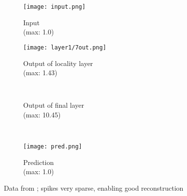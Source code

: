 \begin{figure}[h]
	\centering
	\graphicspath{{resources/models/3neurEx/fullRun/cycle_clean/}}
	\begin{subfigure}{.16\textwidth}
		\centering
		\texttt{[image: input.png]}
		\caption{Input\\(max: 1.0)}
	\end{subfigure}
	\begin{minipage}{.5\textwidth}
		\centering
		\begin{subfigure}{.8\textwidth}
			\centering
			\texttt{[image: layer1/7out.png]}
			\caption{Output of locality layer\\(max: 1.43)}
		\end{subfigure}\\
		\vfill
		\begin{subfigure}{.8\textwidth}
			\centering
			\caption{Output of final layer\\(max: 10.45)}
		\end{subfigure}
	\end{minipage}
	\begin{minipage}{.25\textwidth}
		\centering
		\vspace{-10pt}
		\hspace{-15pt}
		\\
		\vspace{2em}
		\begin{subfigure}{\textwidth}
			\centering
			\texttt{[image: pred.png]}
			\caption{Prediction\\(max: 1.0)}
		\end{subfigure}
	\end{minipage}
	\caption{Data from ; spikes very sparse, enabling 
	good reconstruction}
	\label{fig:cyclerun_clean}
\end{figure}


